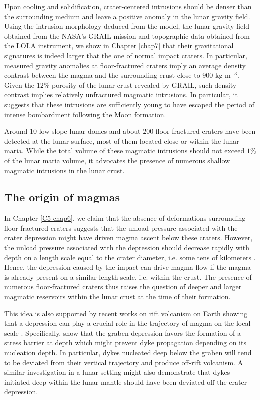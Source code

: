 Upon cooling and solidification,  crater-centered intrusions should be
denser than the surrounding medium and leave a positive anomaly in the
lunar gravity field.  Using the  intrusion morphology deduced from the
model, the lunar gravity field  obtained from the NASA’s GRAIL mission
and topographic  data obtained  from the LOLA  instrument, we  show in
Chapter  \ref{chap7} that  their  gravitational  signatures is  indeed
larger that the one of  normal impact craters. In particular, measured
gravity anomalies at floor-fractured  craters imply an average density
contrast between the magma and the surrounding crust close to $900$ kg
m$^{-3}$. Given  the $12\%$  porosity of the  lunar crust  revealed by
GRAIL, such  density contrast implies relatively  unfractured magmatic
intrusions.   In particular,  it  suggests that  these intrusions  are
sufficiently young to  have escaped the period  of intense bombardment
following the Moon formation.

Around  $10$ low-slope  lunar  domes and  about $200$  floor-fractured
craters have been detected at the  lunar surface, most of them located
close  or within  the lunar  maria. While  the total  volume of  these
magmatic intrusions should not exceed $1\%$ of the lunar maria volume,
it advocates the  presence of numerous shallow  magmatic intrusions in
the lunar crust.

\subsection{The origin of magmas}
\label{sec:crust-magm-intr}

In Chapter  \ref{C5-chap6}, we claim  that the absence  of deformations
surrounding floor-fractured craters suggests  that the unload pressure
associated with  the crater depression  might have driven  magma ascent
below these craters. However, the  unload pressure associated with the
depression should decrease rapidly with  depth on a length scale equal
to   the   crater   diameter,    i.e.    some   tens   of   kilometers
\citep{Pinel:2000wa}. Hence,  the depression caused by  the impact can
drive magma flow  if the magma is already present  on a similar length
scale, i.e. within the crust. The presence of numerous floor-fractured
craters  thus  raises  the  question of  deeper  and  larger  magmatic
reservoirs within the lunar crust at the time of their formation.

This idea is also supported by recent works on rift volcanism on Earth
showing that a depression can play a crucial role in the trajectory of
magma  on the  local  scale \citep{Maccaferri:2014ft}.   Specifically,
\citet{Maccaferri:2014ft} show  that the graben depression  favors the
formation  of a  stress  barrier  at depth  which  might prevent  dyke
propagation depending  on its  nucleation depth. In  particular, dykes
nucleated deep  below the graben will  tend to be deviated  from their
vertical  trajectory  and  produce   off-rift  volcanism.   A  similar
investigation in  a lunar  setting might  also demonstrate  that dykes
initiated deep within  the lunar mantle should have  been deviated off
the crater depression. 

